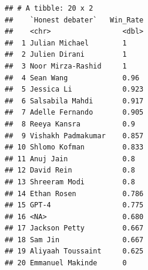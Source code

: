\documentclass[
]{article}
\newenvironment{Shaded}{\begin{snugshade}}{\end{snugshade}}
\newcommand{\AttributeTok}[1]{\textcolor[rgb]{0.77,0.63,0.00}{#1}}
\newcommand{\CommentTok}[1]{\textcolor[rgb]{0.56,0.35,0.01}{\textit{#1}}}
\newcommand{\FloatTok}[1]{\textcolor[rgb]{0.00,0.00,0.81}{#1}}
\newcommand{\FunctionTok}[1]{\textcolor[rgb]{0.00,0.00,0.00}{#1}}
\newcommand{\NormalTok}[1]{#1}
\newcommand{\OtherTok}[1]{\textcolor[rgb]{0.56,0.35,0.01}{#1}}
\newcommand{\SpecialCharTok}[1]{\textcolor[rgb]{0.00,0.00,0.00}{#1}}
\newcommand{\StringTok}[1]{\textcolor[rgb]{0.31,0.60,0.02}{#1}}
\begin{document}
\begin{verbatim}
## # A tibble: 20 x 2
##    `Honest debater`   Win_Rate
##    <chr>                 <dbl>
##  1 Julian Michael        1    
##  2 Julien Dirani         1    
##  3 Noor Mirza-Rashid     1    
##  4 Sean Wang             0.96 
##  5 Jessica Li            0.923
##  6 Salsabila Mahdi       0.917
##  7 Adelle Fernando       0.905
##  8 Reeya Kansra          0.9  
##  9 Vishakh Padmakumar    0.857
## 10 Shlomo Kofman         0.833
## 11 Anuj Jain             0.8  
## 12 David Rein            0.8  
## 13 Shreeram Modi         0.8  
## 14 Ethan Rosen           0.786
## 15 GPT-4                 0.775
## 16 <NA>                  0.680
## 17 Jackson Petty         0.667
## 18 Sam Jin               0.667
## 19 Aliyaah Toussaint     0.625
## 20 Emmanuel Makinde      0
\end{verbatim}

\begin{Shaded}
\end{Shaded}
\end{document}
